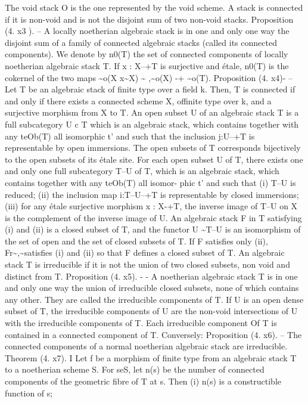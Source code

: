 \documentclass[11pt]{article}
\theoremstyle{plain}
\theoremstyle{definition}
\theoremstyle{remark}
\begin{document}
The void stack O is the one represented by the void scheme. A stack is connected if it is non-void and is not the disjoint sum of two non-void stacks. Proposition (4. x3 ). -- A locally noetherian algebraic stack is in one and only one way the disjoint sum of a family of connected algebraic stacks (called its connected components). We denote by n0(T) the set of connected components of locally noetherian algebraic stack T. If x : X--+T is surjective and étale, n0(T) is the cokernel of the two maps \textasciitilde{}o(X x\textasciitilde{}X) \textasciitilde{} ,\textasciitilde{}o(X) -+ \textasciitilde{}o(T). Proposition (4. x4)- -- Let T be an algebraic stack of finite type over a field k. Then, T is connected if and only if there exists a connected scheme X, offinite type over k, and a surjective morphism from X to T. An open subset U of an algebraic stack T is a full subcategory U c T which is an algebraic stack, which contains together with any teOb(T) all isomorphic t' and such that the inclusion j:U--+T is representable by open immersions. The open subsets of T corresponds bijectively to the open subsets of its étale site. For each open subset U of T, there exists one and only one full subcategory T--U of T, which is an algebraic stack, which contains together with any teOb(T) all isomor- phic t' and such that (i) T--U is reduced; (ii) the inclusion map i:T--U--+T is representable by closed immersions; (iii) for any étale surjective morphism x : X-+T, the inverse image of T--U on X is the complement of the inverse image of U. An algebraic stack F in T satisfying (i) and (ii) is a closed subset of T, and the functor U \textasciitilde{}T--U is an isomorphism of the set of open and the set of closed subsets of T. If F satisfies only (ii), Fr\textasciitilde{},\textasciitilde{}satisfies (i) and (ii) so that F defines a closed subset of T. An algebraic stack T is irreducible if it is not the union of two closed subsets, non void and distinct from T. Proposition (4. x5). - - A noetherian algebraic stack T is in one and only one way the union of irreducible closed subsets, none of which contains any other. They are called the irreducible components of T. If U is an open dense subset of T, the irreducible components of U are the non-void intersections of U with the irreducible components of T. Each irreducible component Of T is contained in a connected component of T. Conversely: Proposition (4. x6). -- The connected components of a normal noetherian algebraic stack are irreducible. Theorem (4. x7). I Let f be a morphism of finite type from an algebraic stack T to a noetherian scheme S. For seS, let n(s) be the number of connected components of the geometric fibre of T at s. Then (i) n(s) is a constructible function of s;
\end{document}
